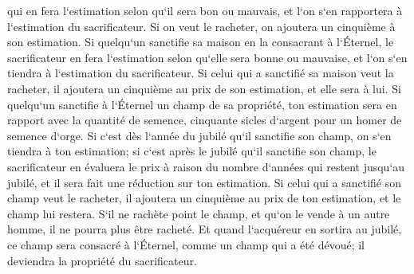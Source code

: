 \verse qui en fera l`estimation selon qu`il sera bon ou mauvais, et l`on s`en rapportera à l`estimation du sacrificateur. 
\verse Si on veut le racheter, on ajoutera un cinquième à son estimation. 
\verse Si quelqu`un sanctifie sa maison en la consacrant à l`Éternel, le sacrificateur en fera l`estimation selon qu`elle sera bonne ou mauvaise, et l`on s`en tiendra à l`estimation du sacrificateur. 
\verse Si celui qui a sanctifié sa maison veut la racheter, il ajoutera un cinquième au prix de son estimation, et elle sera à lui. 
\verse Si quelqu`un sanctifie à l`Éternel un champ de sa propriété, ton estimation sera en rapport avec la quantité de semence, cinquante sicles d`argent pour un homer de semence d`orge. 
\verse Si c`est dès l`année du jubilé qu`il sanctifie son champ, on s`en tiendra à ton estimation; 
\verse si c`est après le jubilé qu`il sanctifie son champ, le sacrificateur en évaluera le prix à raison du nombre d`années qui restent jusqu`au jubilé, et il sera fait une réduction sur ton estimation. 
\verse Si celui qui a sanctifié son champ veut le racheter, il ajoutera un cinquième au prix de ton estimation, et le champ lui restera. 
\verse S`il ne rachète point le champ, et qu`on le vende à un autre homme, il ne pourra plus être racheté. 
\verse Et quand l`acquéreur en sortira au jubilé, ce champ sera consacré à l`Éternel, comme un champ qui a été dévoué; il deviendra la propriété du sacrificateur. 
